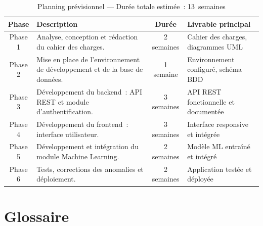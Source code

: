 \documentclass[12pt,a4paper]{report}
\begin{document}
\begin{table}[H]
\centering
\renewcommand{\arraystretch}{1.4}
\begin{tabularx}{\textwidth}{|c|X|c|p{4cm}|}
\hline
\textbf{Phase} & \textbf{Description} & \textbf{Durée} &
  \textbf{Livrable principal} \\
\hline
Phase 1 & Analyse, conception et rédaction du cahier des charges. &
  2 semaines & Cahier des charges, diagrammes UML \\
\hline
Phase 2 & Mise en place de l'environnement de développement et de la base de
  données. & 1 semaine & Environnement configuré, schéma BDD \\
\hline
Phase 3 & Développement du backend~: API REST et module d'authentification. &
  3 semaines & API REST fonctionnelle et documentée \\
\hline
Phase 4 & Développement du frontend~: interface utilisateur. &
  3 semaines & Interface responsive et intégrée \\
\hline
Phase 5 & Développement et intégration du module Machine Learning. &
  2 semaines & Modèle ML entraîné et intégré \\
\hline
Phase 6 & Tests, corrections des anomalies et déploiement. &
  2 semaines & Application testée et déployée \\
\hline
\end{tabularx}
\caption{Planning prévisionnel --- Durée totale estimée~: 13~semaines}
\end{table}

\chapter{Glossaire}
\end{document}
